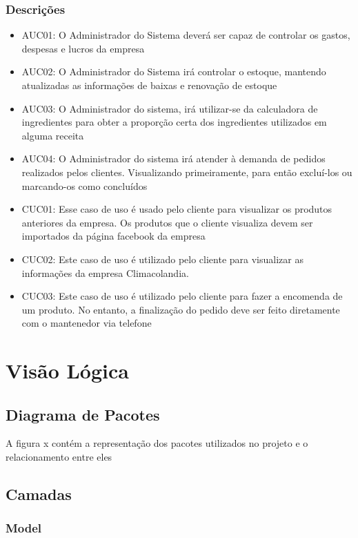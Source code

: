 \subsubsection{Descrições}

\begin{itemize}
	\item AUC01: O Administrador do Sistema deverá ser capaz de controlar os gastos, despesas e lucros da empresa
	\item AUC02: O Administrador do Sistema irá controlar o estoque, mantendo atualizadas as informações de baixas e renovação de estoque
	\item AUC03: O Administrador do sistema, irá utilizar-se da calculadora de ingredientes para obter a proporção certa dos ingredientes utilizados em alguma receita
	\item AUC04: O Administrador do sistema irá atender à demanda de pedidos realizados pelos clientes. Visualizando primeiramente, para então excluí-los ou marcando-os como concluídos
	\item CUC01: Esse caso de uso é usado pelo cliente para visualizar os produtos anteriores da empresa. Os produtos que o cliente visualiza devem ser importados da página facebook da empresa
	\item CUC02: Este caso de uso é utilizado pelo cliente para visualizar as informações da empresa Climacolandia. 
	\item CUC03: Este caso de uso é utilizado pelo cliente para fazer a encomenda de um produto. No entanto, a finalização do pedido deve ser feito diretamente com o mantenedor via telefone
\end{itemize}

\section{Visão Lógica}
\subsection{Diagrama de Pacotes}

A figura x contém a representação dos pacotes utilizados no projeto e o relacionamento entre eles


\subsection{Camadas}
\subsubsection{Model}

